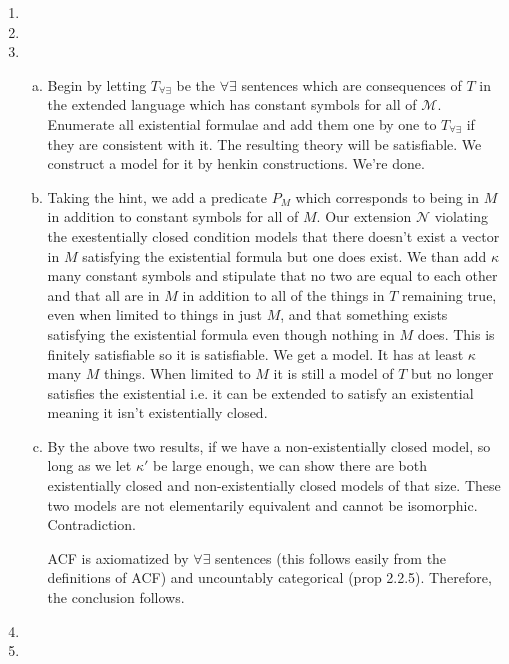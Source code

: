 \documentclass[10pt]{article}
\newcommand{\A}{\forall}
\newcommand{\mcM}{\mathcal{M}}
\newcommand{\mcN}{\mathcal{N}}
\newcommand{\E}{\exists}
\begin{document}
\begin{enumerate}[1.]
\item

\item
 
\item 
  \begin{enumerate}[a)]
  \item Begin by letting \(T_{\A\E}\) be the \(\A\E\) sentences which are consequences of \(T\) in the extended language which has constant symbols for all of \(\mcM\). 
Enumerate all existential formulae and add them one by one to \(T_{\A\E}\) if they are consistent with it. 
The resulting theory will be satisfiable. 
We construct a model for it by henkin constructions. We're done. 

  \item Taking the hint, we add a predicate \(P_M\) which corresponds to being in \(M\) in addition to constant symbols for all of \(M\). 
Our extension \(\mcN\) violating the exestentially closed condition models that there doesn't exist a vector in \(M\) satisfying the existential formula but one does exist. We than add \(\kappa\) many constant symbols and stipulate that no two are equal to each other and that all are in \(M\) in addition to all of the things in \(T\) remaining true, even when limited to things in just \(M\), and that something exists satisfying the existential formula even though nothing in \(M\) does. 
This is finitely satisfiable so it is satisfiable. We get a model. It has at least \(\kappa\) many \(M\) things. 
When limited to \(M\) it is still a model of \(T\) but no longer satisfies the existential i.e. it can be extended to satisfy an existential meaning it isn't existentially closed.   

  \item By the above two results, if we have a non-existentially closed model,  so long as we let \(\kappa'\) be large enough, we can show there are both existentially closed and non-existentially closed models of that size. These two models are not elementarily equivalent and cannot be isomorphic. Contradiction. 

ACF is axiomatized by \(\A\E\) sentences (this follows easily from the definitions of ACF) and uncountably categorical (prop 2.2.5). Therefore, the conclusion follows. 

  \end{enumerate}
 
\item
 
\item
 

\end{enumerate}
\end{document}
